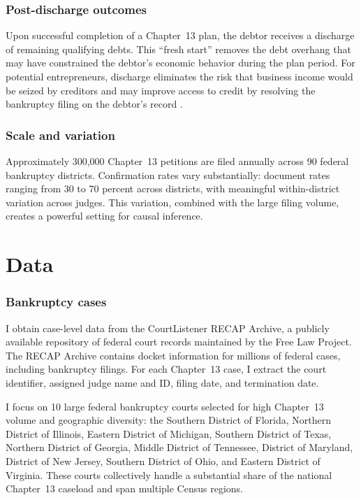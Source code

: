 \documentclass[12pt]{article}
\begin{document}
\subsubsection*{Post-discharge outcomes} Upon successful completion of a Chapter~13 plan, the debtor receives a discharge of remaining qualifying debts. This ``fresh start'' removes the debt overhang that may have constrained the debtor's economic behavior during the plan period. For potential entrepreneurs, discharge eliminates the risk that business income would be seized by creditors and may improve access to credit by resolving the bankruptcy filing on the debtor's record \citep{white2007}.

\subsubsection*{Scale and variation} Approximately 300,000 Chapter~13 petitions are filed annually across 90 federal bankruptcy districts. Confirmation rates vary substantially: \citet{braucher2012} document rates ranging from 30 to 70 percent across districts, with meaningful within-district variation across judges. This variation, combined with the large filing volume, creates a powerful setting for causal inference.

\section{Data}
\label{sec:data}

\subsubsection*{Bankruptcy cases} I obtain case-level data from the CourtListener RECAP Archive, a publicly available repository of federal court records maintained by the Free Law Project. The RECAP Archive contains docket information for millions of federal cases, including bankruptcy filings. For each Chapter~13 case, I extract the court identifier, assigned judge name and ID, filing date, and termination date.

I focus on 10 large federal bankruptcy courts selected for high Chapter~13 volume and geographic diversity: the Southern District of Florida, Northern District of Illinois, Eastern District of Michigan, Southern District of Texas, Northern District of Georgia, Middle District of Tennessee, District of Maryland, District of New Jersey, Southern District of Ohio, and Eastern District of Virginia. These courts collectively handle a substantial share of the national Chapter~13 caseload and span multiple Census regions.
\end{document}
